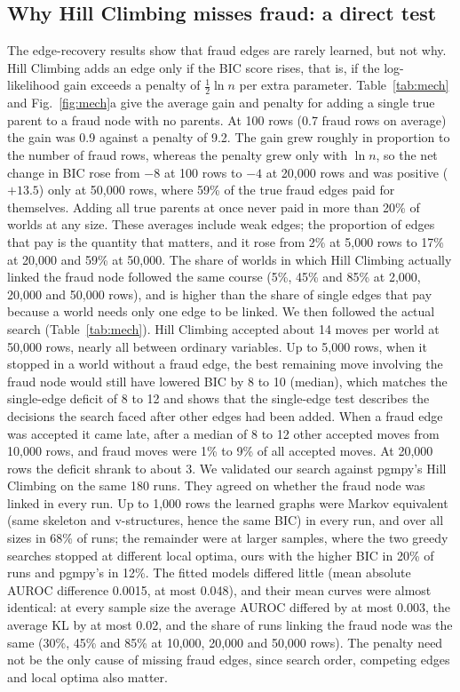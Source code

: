 \documentclass[final,5p,times,authoryear]{elsarticle}
\begin{document}
\subsection{Why Hill Climbing misses fraud: a direct test}\label{sec:mech}
The edge-recovery results show that fraud edges are rarely learned, but not why. Hill Climbing adds an edge only if the BIC score rises, that is, if the log-likelihood gain exceeds a penalty of $\tfrac12\ln n$ per extra parameter. Table~\ref{tab:mech} and Fig.~\ref{fig:mech}a give the average gain and penalty for adding a single true parent to a fraud node with no parents. At 100 rows (0.7 fraud rows on average) the gain was 0.9 against a penalty of 9.2. The gain grew roughly in proportion to the number of fraud rows, whereas the penalty grew only with $\ln n$, so the net change in BIC rose from $-8$ at 100 rows to $-4$ at 20,000 rows and was positive ($+13.5$) only at 50,000 rows, where 59\% of the true fraud edges paid for themselves. Adding all true parents at once never paid in more than 20\% of worlds at any size. These averages include weak edges; the proportion of edges that pay is the quantity that matters, and it rose from 2\% at 5,000 rows to 17\% at 20,000 and 59\% at 50,000. The share of worlds in which Hill Climbing actually linked the fraud node followed the same course (5\%, 45\% and 85\% at 2,000, 20,000 and 50,000 rows), and is higher than the share of single edges that pay because a world needs only one edge to be linked. We then followed the actual search (Table~\ref{tab:mech}). Hill Climbing accepted about 14 moves per world at 50,000 rows, nearly all between ordinary variables. Up to 5,000 rows, when it stopped in a world without a fraud edge, the best remaining move involving the fraud node would still have lowered BIC by 8 to 10 (median), which matches the single-edge deficit of 8 to 12 and shows that the single-edge test describes the decisions the search faced after other edges had been added. When a fraud edge was accepted it came late, after a median of 8 to 12 other accepted moves from 10,000 rows, and fraud moves were 1\% to 9\% of all accepted moves. At 20,000 rows the deficit shrank to about 3. We validated our search against pgmpy's Hill Climbing on the same 180 runs. They agreed on whether the fraud node was linked in every run. Up to 1,000 rows the learned graphs were Markov equivalent (same skeleton and v-structures, hence the same BIC) in every run, and over all sizes in 68\% of runs; the remainder were at larger samples, where the two greedy searches stopped at different local optima, ours with the higher BIC in 20\% of runs and pgmpy's in 12\%. The fitted models differed little (mean absolute AUROC difference 0.0015, at most 0.048), and their mean curves were almost identical: at every sample size the average AUROC differed by at most 0.003, the average KL by at most 0.02, and the share of runs linking the fraud node was the same (30\%, 45\% and 85\% at 10,000, 20,000 and 50,000 rows). The penalty need not be the only cause of missing fraud edges, since search order, competing edges and local optima also matter.
\end{document}
